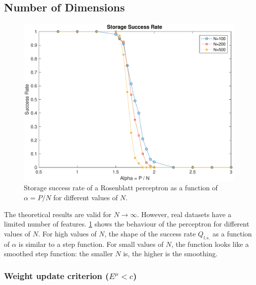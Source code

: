 \subsection{Number of Dimensions}
\label{subsec:dimensions}
\begin{figure}[t]
	\centering
	\includegraphics[width=\columnwidth]{figures/multiple_n}
    \caption{Storage success rate of a Rosenblatt perceptron as a function of $\alpha = P / N$ for different values of $N$.}
	\label{fig:multiple_n}
\end{figure}

The theoretical results are valid for $N \to \infty$.
However, real datasets have a limited number of features.
\cref{fig:multiple_n} shows the behaviour of the perceptron for different values of $N$.
For high values of $N$, the shape of the success rate $Q_{l.s.}$ as a function of $\alpha$ is similar to a step function.
For small values of $N$, the function looks like a smoothed step function:
the smaller $N$ is, the higher is the smoothing.

\subsubsection{Weight update criterion ($E^\mu < c$)}
\label{subsec:c}


